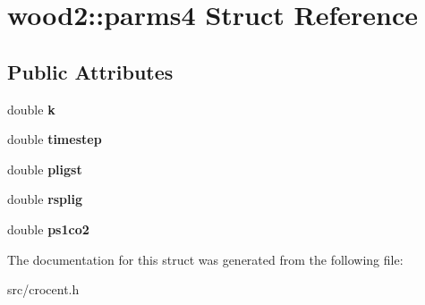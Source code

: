 \hypertarget{structwood2_1_1parms4}{\section{wood2\-:\-:parms4 Struct Reference}
\label{structwood2_1_1parms4}
}
\subsection*{Public Attributes}
\begin{DoxyCompactItemize}
\item 
\hypertarget{structwood2_1_1parms4_ab28b4b363ffb32e9e48f536e42f58852}{double {\bfseries k}}\label{structwood2_1_1parms4_ab28b4b363ffb32e9e48f536e42f58852}

\item 
\hypertarget{structwood2_1_1parms4_a85c6f4c3aff5f76b8e5601902e136fdf}{double {\bfseries timestep}}\label{structwood2_1_1parms4_a85c6f4c3aff5f76b8e5601902e136fdf}

\item 
\hypertarget{structwood2_1_1parms4_a6e685d241cdc508543073af2cbbb6f1f}{double {\bfseries pligst}}\label{structwood2_1_1parms4_a6e685d241cdc508543073af2cbbb6f1f}

\item 
\hypertarget{structwood2_1_1parms4_aa826913ba36dd2aac0815f290c2fddce}{double {\bfseries rsplig}}\label{structwood2_1_1parms4_aa826913ba36dd2aac0815f290c2fddce}

\item 
\hypertarget{structwood2_1_1parms4_a759d4cd8066cfdf24e9d80732f94f505}{double {\bfseries ps1co2}}\label{structwood2_1_1parms4_a759d4cd8066cfdf24e9d80732f94f505}

\end{DoxyCompactItemize}


The documentation for this struct was generated from the following file\-:\begin{DoxyCompactItemize}
\item 
src/crocent.\-h\end{DoxyCompactItemize}
